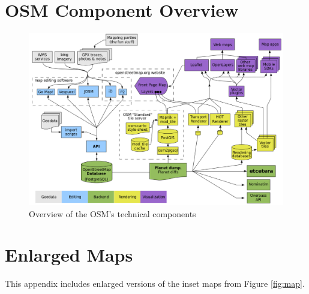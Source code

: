 \appendix

\chapter{OSM Component Overview}
\label{appendix:comp}

\begin{figure}[H] %
    \centering %
    \includegraphics[width = \textwidth]{Images/components.PNG} %
    \caption{Overview of the OSM's technical components \parencite{openstreetmap_wiki_component_2018}} %
\end{figure}

\chapter{Enlarged Maps}
\label{appendixlabel1}

This appendix includes enlarged versions of the inset maps from Figure \ref{fig:map}.

